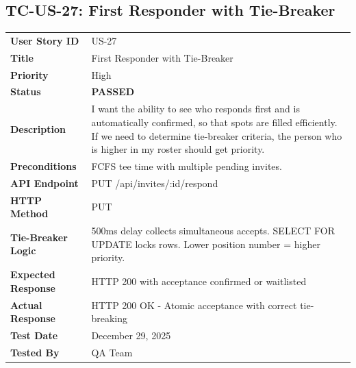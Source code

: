 \documentclass[11pt,a4paper]{article}
\newcommand{\passed}{\textcolor{pass}{\textbf{PASSED}}}
\begin{document}
\vspace{0.5cm}


\subsection{TC-US-27: First Responder with Tie-Breaker}

\begin{tabularx}{\textwidth}{|p{3.2cm}|Y|}
\hline
{}
 \\
\hline
\textbf{User Story ID} & US-27 \\
\hline
\textbf{Title} & First Responder with Tie-Breaker \\
\hline
\textbf{Priority} & High \\
\hline
\textbf{Status} & \passed \\
\hline
\textbf{Description} & I want the ability to see who responds first and is automatically confirmed, so that spots are filled efficiently. If we need to determine tie-breaker criteria, the person who is higher in my roster should get priority. \\
\hline
\textbf{Preconditions} & FCFS tee time with multiple pending invites. \\
\hline
\textbf{API Endpoint} & PUT /api/invites/:id/respond \\
\hline
\textbf{HTTP Method} & PUT \\
\hline
\textbf{Tie-Breaker Logic} & 500ms delay collects simultaneous accepts. SELECT FOR UPDATE locks rows. Lower position number = higher priority. \\
\hline
\textbf{Expected Response} & HTTP 200 with acceptance confirmed or waitlisted \\
\hline
\textbf{Actual Response} & HTTP 200 OK - Atomic acceptance with correct tie-breaking \\
\hline
\textbf{Test Date} & December 29, 2025 \\
\hline
\textbf{Tested By} & QA Team \\
\hline
\end{tabularx}
\end{document}
